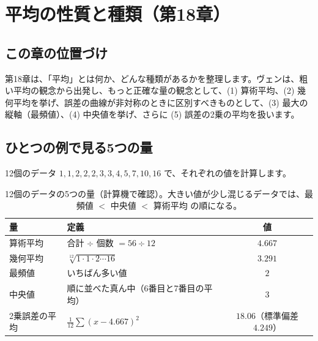\documentclass[a4paper,11pt,openany]{ltjsbook}
\begin{document}
\chapter{平均の性質と種類（第18章）}

\section{この章の位置づけ}

第18章は、「平均」とは何か、どんな種類があるかを整理します。ヴェンは、粗い平均の観念から出発し、もっと正確な量の観念として、(1) 算術平均、(2) 幾何平均を挙げ、誤差の曲線が非対称のときに区別すべきものとして、(3) 最大の縦軸（最頻値）、(4) 中央値を挙げ、さらに (5) 誤差の2乗の平均を扱います。

\section{ひとつの例で見る5つの量}

12個のデータ $1,1,2,2,2,3,3,4,5,7,10,16$ で、それぞれの値を計算します。

\begin{table}[htbp]
\centering
\begin{tabular}{llc}
\toprule
量 & 定義 & 値\\
\midrule
算術平均 & 合計 $\div$ 個数 $=56\div12$ & $4.667$\\
幾何平均 & $\sqrt[12]{1\cdot1\cdot2\cdots16}$ & $3.291$\\
最頻値 & いちばん多い値 & $2$\\
中央値 & 順に並べた真ん中（6番目と7番目の平均） & $3$\\
2乗誤差の平均 & $\tfrac1{12}\sum(x-4.667)^2$ & $18.06$（標準偏差 $4.249$）\\
\bottomrule
\end{tabular}
\caption{12個のデータの5つの量（計算機で確認）。大きい値が少し混じるデータでは、最頻値 $<$ 中央値 $<$ 算術平均 の順になる。}
\end{table}
\end{document}
